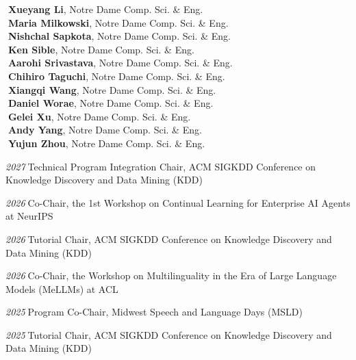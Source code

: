 \documentclass[10pt]{article}
\newenvironment{myindentpar}[1]%
{\begin{list}{}%
         {\setlength{\leftmargin}{#1}}%
         \item[]%
}
{\end{list}}
\newcounter{list}
\begin{document}
\begin{myindentpar}{0.75cm}
{\textcolor{white}{.}{\bf Xueyang Li}, Notre Dame Comp. Sci. \& Eng. \\
\textcolor{white}{.}{\bf Maria Milkowski}, Notre Dame Comp. Sci. \& Eng. \\
\textcolor{white}{.}{\bf Nishchal Sapkota}, Notre Dame Comp. Sci. \& Eng. \\
\textcolor{white}{.}{\bf Ken Sible}, Notre Dame Comp. Sci. \& Eng. \\
\textcolor{white}{.}{\bf Aarohi Srivastava}, Notre Dame Comp. Sci. \& Eng. \\
\textcolor{white}{.}{\bf Chihiro Taguchi}, Notre Dame Comp. Sci. \& Eng. \\
\textcolor{white}{.}{\bf Xiangqi Wang}, Notre Dame Comp. Sci. \& Eng. \\
\textcolor{white}{.}{\bf Daniel Worae}, Notre Dame Comp. Sci. \& Eng. \\
\textcolor{white}{.}{\bf Gelei Xu}, Notre Dame Comp. Sci. \& Eng. \\
\textcolor{white}{.}{\bf Andy Yang}, Notre Dame Comp. Sci. \& Eng. \\
\textcolor{white}{.}{\bf Yujun Zhou}, Notre Dame Comp. Sci. \& Eng.

}

\hspace{-0.75cm}{\bf Organizing Committee}

{\small

\hspace{-0.75cm}\textit{2027}\textcolor{white}{.}Technical Program Integration Chair, ACM SIGKDD Conference on Knowledge Discovery and Data Mining (KDD)

\hspace{-0.75cm}\textit{2026}\textcolor{white}{.}Co-Chair, the 1st Workshop on Continual Learning for Enterprise AI Agents at NeurIPS

\hspace{-0.75cm}\textit{2026}\textcolor{white}{.}Tutorial Chair, ACM SIGKDD Conference on Knowledge Discovery and Data Mining (KDD)

\hspace{-0.75cm}\textit{2026}\textcolor{white}{.}Co-Chair, the Workshop on Multilinguality in the Era of Large Language Models (MeLLMs) at ACL

\hspace{-0.75cm}\textit{2025}\textcolor{white}{.}Program Co-Chair, Midwest Speech and Language Days (MSLD)

\hspace{-0.75cm}\textit{2025}\textcolor{white}{.}Tutorial Chair, ACM SIGKDD Conference on Knowledge Discovery and Data Mining (KDD)

}
\end{myindentpar}
\end{document}
